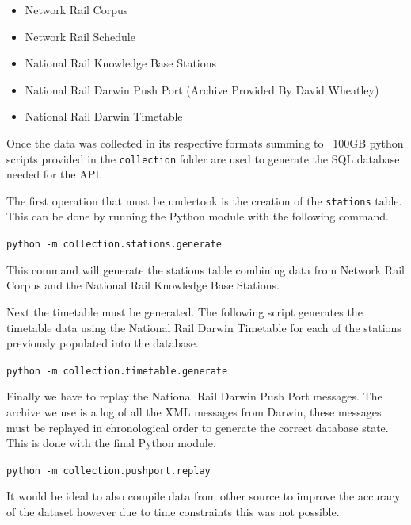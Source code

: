 \documentclass[10pt,a4paper]{article}
\begin{document}
\begin{itemize}
  \item Network Rail Corpus
  \item Network Rail Schedule
  \item National Rail Knowledge Base Stations
  \item National Rail Darwin Push Port (Archive Provided By David Wheatley)
  \item National Rail Darwin Timetable
\end{itemize}

\noindent
Once the data was collected in its respective formats summing to ~100GB python scripts provided in the \texttt{collection} folder are used to generate the SQL database needed for the API.

\noindent
\newline
The first operation that must be undertook is the creation of the \texttt{stations} table. This can be done by running the Python module with the following command.

\noindent
\newline
\texttt{python -m collection.stations.generate}

\noindent
\newline
This command will generate the stations table combining data from Network Rail Corpus and the National Rail Knowledge Base Stations.

\noindent
\newline
Next the timetable must be generated. The following script generates the timetable data using the National Rail Darwin Timetable for each of the stations previously populated into the database.

\noindent
\newline
\texttt{python -m collection.timetable.generate}

\noindent
\newline
Finally we have to replay the National Rail Darwin Push Port messages. The archive we use is a log of all the XML messages from Darwin, these messages must be replayed in chronological order to generate the correct database state. This is done with the final Python module.

\noindent
\newline
\texttt{python -m collection.pushport.replay}

\noindent
\newline
It would be ideal to also compile data from other source to improve the accuracy of the dataset however due to time constraints this was not possible.
\end{document}
